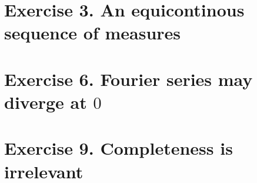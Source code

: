 \section{Exercise 3. An equicontinous sequence of measures}

\section{Exercise 6. Fourier series may diverge at $0$}

\section{Exercise 9. Completeness is irrelevant}
